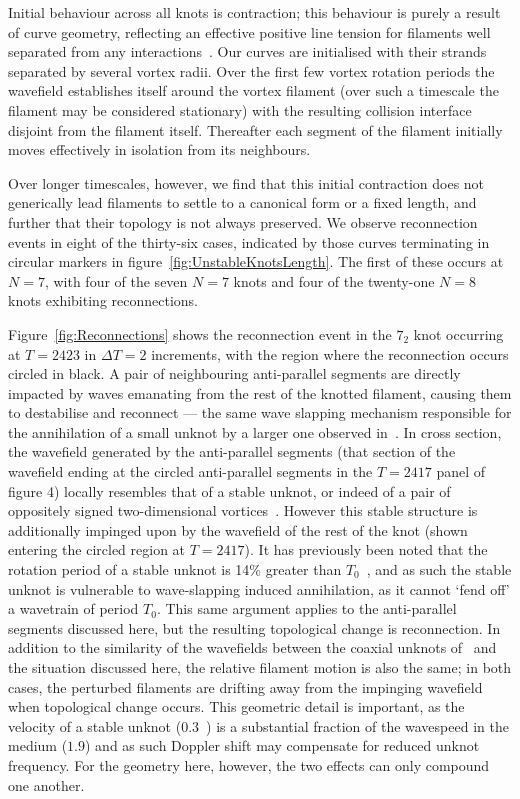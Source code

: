 Initial behaviour across all knots is contraction; this behaviour is purely a result of curve geometry, reflecting an effective positive line tension for filaments well separated from any interactions~\citep{Biktashev1994}. Our curves are initialised with their strands separated by several vortex radii. Over the first few vortex rotation periods the wavefield establishes itself around the vortex filament (over such a timescale the filament may be considered stationary) with the resulting collision interface disjoint from the filament itself. Thereafter each segment of the filament initially moves effectively in isolation from its neighbours. 

Over longer timescales, however, we find that this initial contraction does not generically lead filaments to settle to a canonical form or a fixed length, and further that their topology is not always preserved. We observe reconnection events in eight of the thirty-six cases, indicated by those curves terminating in circular markers in figure~\ref{fig:UnstableKnotsLength}. The first of these occurs at $N=7$, with four of the seven $N=7$ knots and four of the twenty-one $N=8$ knots exhibiting reconnections.

Figure~\ref{fig:Reconnections} shows the reconnection event in the $7_2$ knot occurring at $T=2423$ in $\Delta T=2$ increments, with the region where the reconnection occurs circled in black. A pair of neighbouring anti-parallel segments are directly impacted by waves emanating from the rest of the knotted filament, causing them to destabilise and reconnect --- the same wave slapping mechanism responsible for the annihilation of a small unknot by a larger one observed in~\citep{Maucher2018}. In cross section, the wavefield generated by the anti-parallel segments (that section of the wavefield ending at the circled anti-parallel segments in the $T=2417$ panel of figure 4) locally resembles that of a stable unknot, or indeed of a pair of oppositely signed two-dimensional vortices~\citep{Courtemanche1990}. However this stable structure is additionally impinged upon by the wavefield of the rest of the knot (shown entering the circled region at $T=2417$). It has previously been noted that the rotation period of a stable unknot is 14\% greater than $T_0$~\citep{Maucher2018}, and as such the stable unknot is vulnerable to wave-slapping induced annihilation, as it cannot `fend off' a wavetrain of period $T_0$. This same argument applies to the anti-parallel segments discussed here, but the resulting topological change is reconnection. In addition to the similarity of the wavefields between the coaxial unknots of~\citep{Maucher2018} and the situation discussed here, the relative filament motion is also the same; in both cases, the perturbed filaments are drifting away from the impinging wavefield when topological change occurs. This geometric detail is important, as the velocity of a stable unknot ($0.3$~\citep{Maucher2018}) is a substantial fraction of the wavespeed in the medium ($1.9$) and as such Doppler shift may compensate for reduced unknot frequency. For the geometry here, however, the two effects can only compound one another. 

